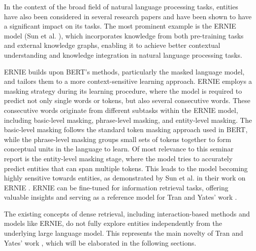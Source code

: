 In the context of the broad field of natural language processing tasks, entities have also been considered in several research papers and have been shown to have a significant impact on its tasks. The most prominent example is the ERNIE model (Sun et al. \cite{ernie}), which incorporates knowledge from both pre-training tasks and external knowledge graphs, enabling it to achieve better contextual understanding and knowledge integration in natural language processing tasks. 

ERNIE builds upon BERT's methods, particularly the masked language model, and tailors them to a more context-sensitive learning approach. ERNIE employs a masking strategy during its learning procedure, where the model is required to predict not only single words or tokens, but also several consecutive words. These consecutive words originate from different subtasks within the ERNIE model, including basic-level masking, phrase-level masking, and entity-level masking. The basic-level masking follows the standard token masking approach used in BERT, while the phrase-level masking groups small sets of tokens together to form conceptual units in the language to learn. Of most relevance to this seminar report is the entity-level masking stage, where the model tries to accurately predict entities that can span multiple tokens. This leads to the model becoming highly sensitive towards entities, as demonstrated by Sun et al. in their work on ERNIE \cite{ernie}. ERNIE can be fine-tuned for information retrieval tasks, offering valuable insights and serving as a reference model for Tran and Yates' work \cite{tran2022dense}.

The existing concepts of dense retrieval, including interaction-based methods and models like ERNIE, do not fully explore entities independently from the underlying large language model. This represents the main novelty of Tran and Yates' work \cite{tran2022dense}, which will be elaborated in the following sections.



